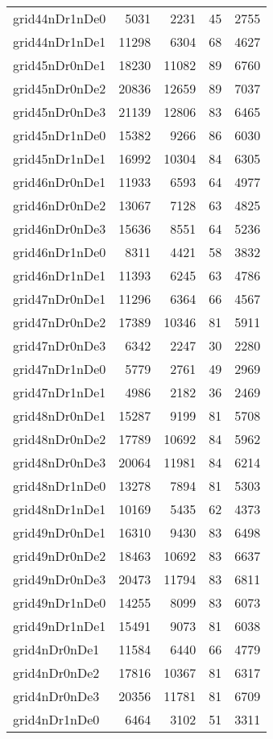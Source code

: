 \documentclass[../../../thesis.tex]{subfiles}
\begin{document}
\begin{longtable}{lrrrr}
grid44nDr1nDe0 & 5031 & 2231 & 45 & 2755 \\
grid44nDr1nDe1 & 11298 & 6304 & 68 & 4627 \\
grid45nDr0nDe1 & 18230 & 11082 & 89 & 6760 \\
grid45nDr0nDe2 & 20836 & 12659 & 89 & 7037 \\
grid45nDr0nDe3 & 21139 & 12806 & 83 & 6465 \\
grid45nDr1nDe0 & 15382 & 9266 & 86 & 6030 \\
grid45nDr1nDe1 & 16992 & 10304 & 84 & 6305 \\
grid46nDr0nDe1 & 11933 & 6593 & 64 & 4977 \\
grid46nDr0nDe2 & 13067 & 7128 & 63 & 4825 \\
grid46nDr0nDe3 & 15636 & 8551 & 64 & 5236 \\
grid46nDr1nDe0 & 8311 & 4421 & 58 & 3832 \\
grid46nDr1nDe1 & 11393 & 6245 & 63 & 4786 \\
grid47nDr0nDe1 & 11296 & 6364 & 66 & 4567 \\
grid47nDr0nDe2 & 17389 & 10346 & 81 & 5911 \\
grid47nDr0nDe3 & 6342 & 2247 & 30 & 2280 \\
grid47nDr1nDe0 & 5779 & 2761 & 49 & 2969 \\
grid47nDr1nDe1 & 4986 & 2182 & 36 & 2469 \\
grid48nDr0nDe1 & 15287 & 9199 & 81 & 5708 \\
grid48nDr0nDe2 & 17789 & 10692 & 84 & 5962 \\
grid48nDr0nDe3 & 20064 & 11981 & 84 & 6214 \\
grid48nDr1nDe0 & 13278 & 7894 & 81 & 5303 \\
grid48nDr1nDe1 & 10169 & 5435 & 62 & 4373 \\
grid49nDr0nDe1 & 16310 & 9430 & 83 & 6498 \\
grid49nDr0nDe2 & 18463 & 10692 & 83 & 6637 \\
grid49nDr0nDe3 & 20473 & 11794 & 83 & 6811 \\
grid49nDr1nDe0 & 14255 & 8099 & 83 & 6073 \\
grid49nDr1nDe1 & 15491 & 9073 & 81 & 6038 \\
grid4nDr0nDe1 & 11584 & 6440 & 66 & 4779 \\
grid4nDr0nDe2 & 17816 & 10367 & 81 & 6317 \\
grid4nDr0nDe3 & 20356 & 11781 & 81 & 6709 \\
grid4nDr1nDe0 & 6464 & 3102 & 51 & 3311 \\

\end{longtable}
\end{document}
